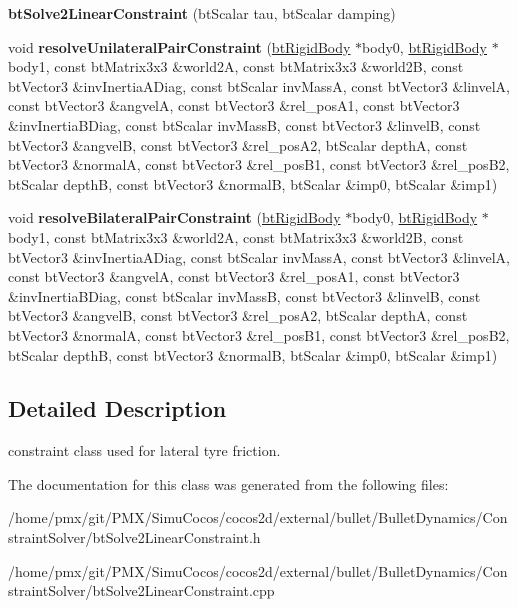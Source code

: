 \begin{DoxyCompactItemize}
\item 
\mbox{\label{classbtSolve2LinearConstraint_a69f16e10c3f4d30be471deedd7a2c7ff}} 
{\bfseries bt\+Solve2\+Linear\+Constraint} (bt\+Scalar tau, bt\+Scalar damping)
\item 
\mbox{\label{classbtSolve2LinearConstraint_af9e0bed2969536107cef14aa07dfef63}} 
void {\bfseries resolve\+Unilateral\+Pair\+Constraint} (\hyperlink{classbtRigidBody}{bt\+Rigid\+Body} $\ast$body0, \hyperlink{classbtRigidBody}{bt\+Rigid\+Body} $\ast$body1, const bt\+Matrix3x3 \&world2A, const bt\+Matrix3x3 \&world2B, const bt\+Vector3 \&inv\+Inertia\+A\+Diag, const bt\+Scalar inv\+MassA, const bt\+Vector3 \&linvelA, const bt\+Vector3 \&angvelA, const bt\+Vector3 \&rel\+\_\+pos\+A1, const bt\+Vector3 \&inv\+Inertia\+B\+Diag, const bt\+Scalar inv\+MassB, const bt\+Vector3 \&linvelB, const bt\+Vector3 \&angvelB, const bt\+Vector3 \&rel\+\_\+pos\+A2, bt\+Scalar depthA, const bt\+Vector3 \&normalA, const bt\+Vector3 \&rel\+\_\+pos\+B1, const bt\+Vector3 \&rel\+\_\+pos\+B2, bt\+Scalar depthB, const bt\+Vector3 \&normalB, bt\+Scalar \&imp0, bt\+Scalar \&imp1)
\item 
\mbox{\label{classbtSolve2LinearConstraint_a65e9392ff0210dee03ae4503b5a9f9b0}} 
void {\bfseries resolve\+Bilateral\+Pair\+Constraint} (\hyperlink{classbtRigidBody}{bt\+Rigid\+Body} $\ast$body0, \hyperlink{classbtRigidBody}{bt\+Rigid\+Body} $\ast$body1, const bt\+Matrix3x3 \&world2A, const bt\+Matrix3x3 \&world2B, const bt\+Vector3 \&inv\+Inertia\+A\+Diag, const bt\+Scalar inv\+MassA, const bt\+Vector3 \&linvelA, const bt\+Vector3 \&angvelA, const bt\+Vector3 \&rel\+\_\+pos\+A1, const bt\+Vector3 \&inv\+Inertia\+B\+Diag, const bt\+Scalar inv\+MassB, const bt\+Vector3 \&linvelB, const bt\+Vector3 \&angvelB, const bt\+Vector3 \&rel\+\_\+pos\+A2, bt\+Scalar depthA, const bt\+Vector3 \&normalA, const bt\+Vector3 \&rel\+\_\+pos\+B1, const bt\+Vector3 \&rel\+\_\+pos\+B2, bt\+Scalar depthB, const bt\+Vector3 \&normalB, bt\+Scalar \&imp0, bt\+Scalar \&imp1)
\end{DoxyCompactItemize}


\subsection{Detailed Description}
constraint class used for lateral tyre friction. 

The documentation for this class was generated from the following files\+:\begin{DoxyCompactItemize}
\item 
/home/pmx/git/\+P\+M\+X/\+Simu\+Cocos/cocos2d/external/bullet/\+Bullet\+Dynamics/\+Constraint\+Solver/bt\+Solve2\+Linear\+Constraint.\+h\item 
/home/pmx/git/\+P\+M\+X/\+Simu\+Cocos/cocos2d/external/bullet/\+Bullet\+Dynamics/\+Constraint\+Solver/bt\+Solve2\+Linear\+Constraint.\+cpp\end{DoxyCompactItemize}
